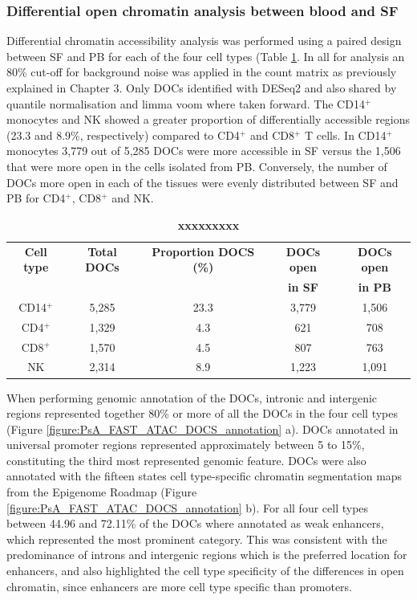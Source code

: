 \subsubsection{Differential open chromatin analysis between blood and SF}
Differential chromatin accessibility analysis was performed using a paired design between SF and PB for each of the four cell types (Table \ref{tab:PSA_DOCs_results}. In all for analysis an 80\% cut-off for background noise was applied in the count matrix as previously explained in Chapter 3. Only DOCs identified with DESeq2 and also shared by quantile normalisation and limma voom where taken forward. The CD14$^+$ monocytes and NK showed a greater proportion of differentially accessible regions (23.3 and 8.9\%, respectively) compared to CD4$^+$ and CD8$^+$ T cells. In CD14$^+$ monocytes 3,779 out of 5,285 DOCs were more accessible in SF versus the 1,506 that were more open in the cells isolated from PB. Conversely, the number of DOCs more open in each of the tissues were evenly distributed between SF and PB for CD4$^+$, CD8$^+$ and NK.


\begin{table}[htbp]
\centering
\begin{tabular}{@{} c c c c c}
\toprule
\textbf{Cell type} & \textbf{Total DOCs} &  \textbf{Proportion DOCS (\%)} &\textbf{DOCs open} & \textbf{DOCs open } \\
                   &                     &                                &\textbf{in SF}     & \textbf{in PB} \\
\midrule
\midrule
CD14$^+$ & 5,285 & 23.3 & 3,779 & 1,506\\
CD4$^+$ & 1,329 & 4.3 & 621 & 708\\
CD8$^+$ & 1,570 & 4.5 & 807 & 763\\
NK      & 2,314 & 8.9 & 1,223 & 1,091\\
\bottomrule
\end{tabular}
\medskip %
\caption[Summary results of the chromatin accessibility analysis between SF and PB in PsA samples]{\textbf{xxxxxxxxx}}
\label{tab:PSA_DOCs_results}
\end{table}



When performing genomic annotation of the DOCs, intronic and intergenic regions represented together 80\% or more of all the DOCs in the four cell types (Figure \ref{figure:PsA_FAST_ATAC_DOCS_annotation} a). DOCs annotated in universal promoter regions represented approximately between 5 to 15\%, constituting the third most represented genomic feature. DOCs were also annotated with the fifteen states cell type-specific chromatin segmentation maps from the Epigenome Roadmap (Figure \ref{figure:PsA_FAST_ATAC_DOCS_annotation} b). For all four cell types between 44.96 and 72.11\% of the DOCs where annotated as weak enhancers, which represented the most prominent category. This was consistent with the predominance of introns and intergenic regions which is the preferred location for enhancers, and also highlighted the cell type specificity of the differences in open chromatin, since enhancers are more cell type specific than promoters.


